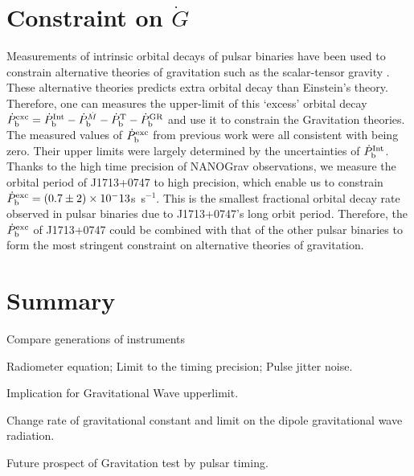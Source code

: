 \section{Constraint on $\dot{G}$}
Measurements of intrinsic orbital decays of pulsar binaries have been used to
constrain alternative theories of gravitation such as the scalar-tensor gravity \citep{lwj+09, fwe+12}. 
These alternative theories predicts extra orbital decay than Einstein's
theory. Therefore, one can measures the upper-limit of this `excess' orbital decay
$\dot{P}_{\rm b}^{\rm exc}=\dot{P}_{\rm b}^{\rm Int} - \dot{P}_{\rm
b}^{\dot{M}}  - \dot{P}_{\rm b}^{\rm T} - \dot{P}_{\rm b}^{\rm GR}$ and use it to constrain the Gravitation theories.
The measured values of $\dot{P}_{\rm b}^{\rm exc}$ from previous work were all
consistent with being zero. Their upper limits were largely determined by the
uncertainties of $\dot{P}_{\rm b}^{\rm Int}$.
Thanks to the high time precision of NANOGrav observations, we measure the
orbital period of J1713+0747 to high precision, which enable us to 
constrain $\dot{P}_{\rm b}^{\rm exc}=(0.7\pm2)\times10^-13$s~s$^{-1}$. 
This is the smallest fractional orbital decay rate observed in pulsar binaries due to J1713+0747's long orbit period.
Therefore, the $\dot{P}_{\rm b}^{\rm exc}$ of J1713+0747 could be
combined with that of the other pulsar binaries to form the most stringent constraint on alternative theories of gravitation. 






\section{Summary}
Compare generations of instruments

Radiometer equation; Limit to the timing precision; Pulse jitter noise.

Implication for Gravitational Wave upperlimit.

Change rate of gravitational constant and limit on the dipole gravitational
wave radiation.

Future prospect of Gravitation test by pulsar timing.
